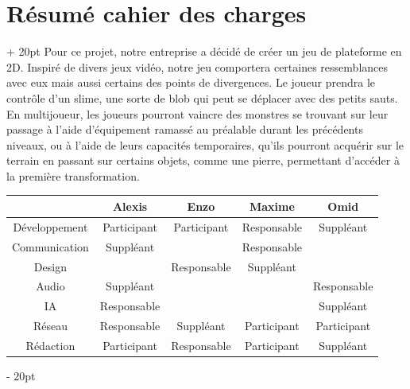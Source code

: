 \documentclass[a4paper, 12pt, twoside]{article}
\newcommand{\ind}[1][20pt]{\advance\leftskip + #1}
\newcommand{\deind}[1][20pt]{\advance\leftskip - #1}
\newenvironment{indt}[2][20pt]{#2 \par \ind[#1]}{\par \deind} %
\begin{document}
    \newpage

    \begin{indt}{\section{Résumé cahier des charges}}
        Pour ce projet, notre entreprise a décidé de créer un jeu de plateforme en 2D. Inspiré de divers jeux vidéo, notre jeu comportera certaines ressemblances avec eux mais aussi certains des points de divergences. Le joueur prendra le contrôle d'un slime, une sorte de blob qui peut se déplacer avec des petits sauts. En multijoueur, les joueurs pourront vaincre des monstres se trouvant sur leur passage à l'aide d'équipement ramassé au préalable durant les précédents niveaux, ou à l'aide de leurs capacités temporaires, qu’ils pourront acquérir sur le terrain en passant sur certains objets, comme une pierre, permettant d’accéder à la première transformation.

        \begin{center}
            \begin{tabular}{|c|c|c|c|c|}
                \hline
                & Alexis & Enzo & Maxime & Omid
                \\
                \hline
                Développement & Participant & Participant & Responsable & Suppléant
                \\
                \hline
                Communication & Suppléant & & Responsable &
                \\
                \hline
                Design & & Responsable & Suppléant &
                \\
                \hline
                Audio & Suppléant & & & Responsable
                \\
                \hline
                IA & Responsable & & & Suppléant
                \\
                \hline
                Réseau & Responsable & Suppléant & Participant & Participant
                \\
                \hline
                Rédaction & Participant & Responsable & Participant & Suppléant
                \\
                \hline
            \end{tabular}
        \end{center}
    \end{indt}
\end{document}
